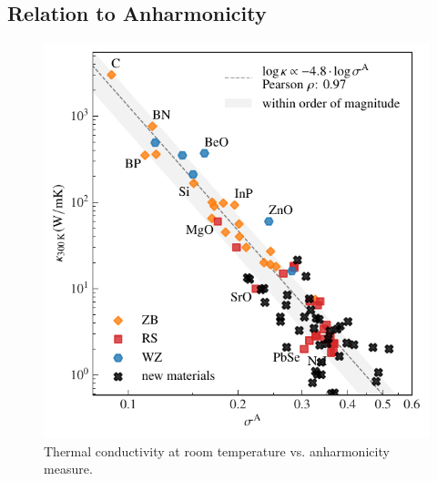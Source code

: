 \subsection{Relation to Anharmonicity}

\begin{figure}
	\includegraphics[width=\textwidth]{./data/plots/anharmonicity/9_kappa/incl_computations/sigma_vs_kappa_annot_comp.pdf}
	\caption{Thermal conductivity at room temperature vs. anharmonicity measure.}
	\label{fig:kappa_sigma_exp_comp}
\end{figure}

